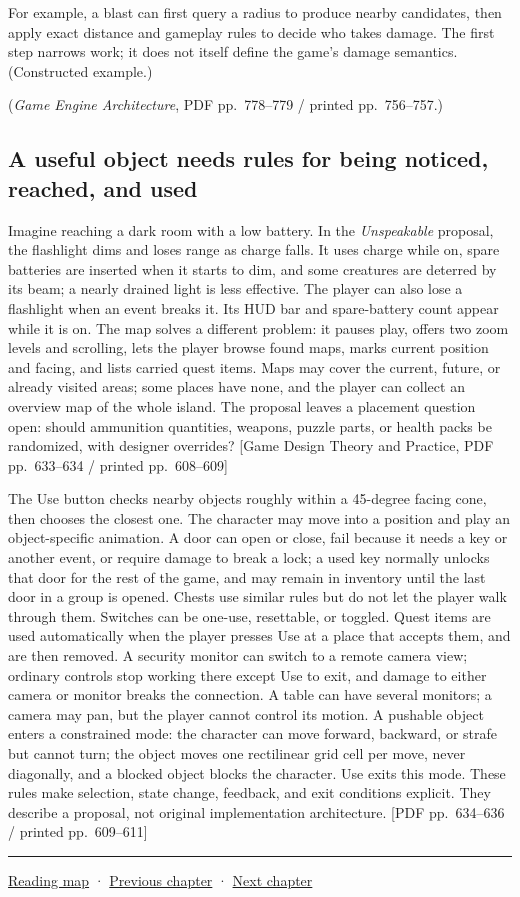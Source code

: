 For example, a blast can first query a radius to produce nearby candidates, then apply exact distance and gameplay rules to decide who takes damage. The first step narrows work; it does not itself define the game's damage semantics. (Constructed example.)

(\emph{Game Engine Architecture}, PDF pp.~778--779 / printed pp.~756--757.)

\subsection{A useful object needs rules for being noticed, reached, and used}\label{06-engine-ii-ch031-a-useful-object-needs-rules-for-being-noticed-reached-and-used}

Imagine reaching a dark room with a low battery. In the \emph{Unspeakable} proposal, the flashlight dims and loses range as charge falls. It uses charge while on, spare batteries are inserted when it starts to dim, and some creatures are deterred by its beam; a nearly drained light is less effective. The player can also lose a flashlight when an event breaks it. Its HUD bar and spare-battery count appear while it is on. The map solves a different problem: it pauses play, offers two zoom levels and scrolling, lets the player browse found maps, marks current position and facing, and lists carried quest items. Maps may cover the current, future, or already visited areas; some places have none, and the player can collect an overview map of the whole island. The proposal leaves a placement question open: should ammunition quantities, weapons, puzzle parts, or health packs be randomized, with designer overrides? {[}Game Design Theory and Practice, PDF pp.~633--634 / printed pp.~608--609{]}

The Use button checks nearby objects roughly within a 45-degree facing cone, then chooses the closest one. The character may move into a position and play an object-specific animation. A door can open or close, fail because it needs a key or another event, or require damage to break a lock; a used key normally unlocks that door for the rest of the game, and may remain in inventory until the last door in a group is opened. Chests use similar rules but do not let the player walk through them. Switches can be one-use, resettable, or toggled. Quest items are used automatically when the player presses Use at a place that accepts them, and are then removed. A security monitor can switch to a remote camera view; ordinary controls stop working there except Use to exit, and damage to either camera or monitor breaks the connection. A table can have several monitors; a camera may pan, but the player cannot control its motion. A pushable object enters a constrained mode: the character can move forward, backward, or strafe but cannot turn; the object moves one rectilinear grid cell per move, never diagonally, and a blocked object blocks the character. Use exits this mode. These rules make selection, state change, feedback, and exit conditions explicit. They describe a proposal, not original implementation architecture. {[}PDF pp.~634--636 / printed pp.~609--611{]}

\begin{center}\rule{0.5\linewidth}{0.5pt}\end{center}

\hyperref[volume-reading-map]{Reading map} · \hyperref[06-engine-ii-ch030-depth-projection-and-shadow-map-precision]{Previous chapter} · \hyperref[06-engine-ii-ch032-terrain-materials-and-image-composition]{Next chapter}
